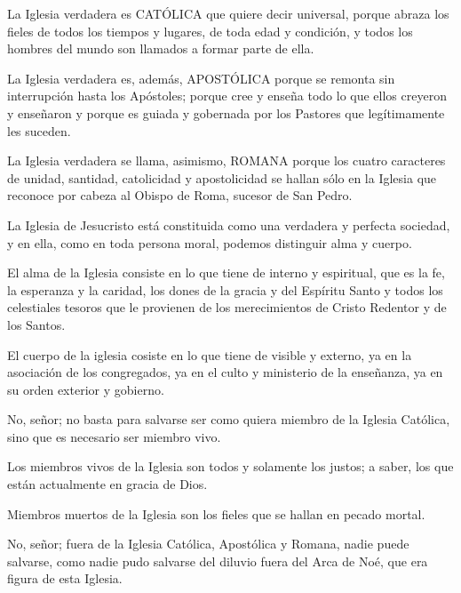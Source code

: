  La Iglesia verdadera es
CATÓLICA que quiere decir universal, porque abraza los fieles de todos los
tiempos y lugares, de toda edad y condición, y todos los hombres del mundo son
llamados a formar parte de ella.

 La Iglesia
verdadera es, además, APOSTÓLICA porque se remonta sin interrupción hasta
los Apóstoles; porque cree y enseña todo lo que ellos creyeron y enseñaron y
porque es guiada y gobernada por los Pastores que legítimamente les suceden.

 La
Iglesia verdadera se llama, asimismo, ROMANA porque los cuatro caracteres de
unidad, santidad, catolicidad y apostolicidad se hallan sólo en la Iglesia que
reconoce por cabeza al Obispo de Roma, sucesor de San Pedro.

 La Iglesia de
Jesucristo está constituida como una verdadera y perfecta sociedad, y en ella,
como en toda persona moral, podemos distinguir alma y cuerpo.

 El alma de la Iglesia consiste en
lo que tiene de interno y espiritual, que es la fe, la esperanza y la caridad, los dones de la gracia y del Espíritu Santo y todos los celestiales tesoros que le provienen de los merecimientos de Cristo Redentor y de los Santos.

 El cuerpo de la iglesia cosiste
en lo que tiene de visible y externo, ya en la asociación de los congregados, ya en
el culto y ministerio de la enseñanza, ya en su orden exterior y gobierno.

No, señor; no basta para salvarse ser como quiera miembro de la Iglesia Católica,
sino que es necesario ser miembro vivo.

 Los miembros vivos de
la Iglesia son todos y solamente los justos; a saber, los que están actualmente en
gracia de Dios.

 Miembros muertos de la Iglesia
son los fieles que se hallan en pecado mortal.

 No, señor; fuera de la Iglesia Católica, Apostólica y Romana, nadie
puede salvarse, como nadie pudo salvarse del diluvio fuera del Arca de Noé, que
era figura de esta Iglesia.

